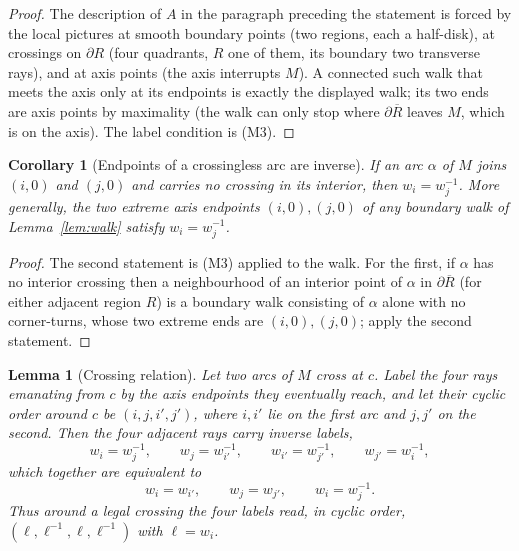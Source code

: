 \documentclass[11pt]{article}
\newtheorem{lemma}{Lemma}
\newtheorem{corollary}{Corollary}
\theoremstyle{definition}
\theoremstyle{remark}
\newcommand{\bdy}{\partial}
\begin{document}
\begin{proof}
The description of $A$ in the paragraph preceding the statement is forced by the
local pictures at smooth boundary points (two regions, each a half-disk), at
crossings on $\bdy R$ (four quadrants, $R$ one of them, its boundary two
transverse rays), and at axis points (the axis interrupts $M$). A connected such
walk that meets the axis only at its endpoints is exactly the displayed walk;
its two ends are axis points by maximality (the walk can only stop where
$\bdy\overline R$ leaves $M$, which is on the axis). The label condition is
(M3).
\end{proof}

\begin{corollary}[Endpoints of a crossingless arc are inverse]\label{lem:arc}
If an arc $\alpha$ of $M$ joins $(i,0)$ and $(j,0)$ and carries no crossing in
its interior, then $w_i=w_j^{-1}$. More generally, the two extreme axis endpoints
$(i,0),(j,0)$ of any boundary walk of Lemma~\ref{lem:walk} satisfy $w_i=w_j^{-1}$.
\end{corollary}

\begin{proof}
The second statement is (M3) applied to the walk. For the first, if $\alpha$ has
no interior crossing then a neighbourhood of an interior point of $\alpha$ in
$\bdy\overline R$ (for either adjacent region $R$) is a boundary walk consisting
of $\alpha$ alone with no corner-turns, whose two extreme ends are $(i,0),(j,0)$;
apply the second statement.
\end{proof}

\begin{lemma}[Crossing relation]\label{lem:cross}
Let two arcs of $M$ cross at $c$. Label the four rays emanating from $c$ by the
axis endpoints they eventually reach, and let their cyclic order around $c$ be
$(i,j,i',j')$, where $i,i'$ lie on the first arc and $j,j'$ on the second. Then
the four \emph{adjacent} rays carry inverse labels,
\begin{equation}\label{eq:cross}
w_i=w_j^{-1},\qquad w_j=w_{i'}^{-1},\qquad w_{i'}=w_{j'}^{-1},\qquad w_{j'}=w_i^{-1},
\end{equation}
which together are equivalent to
\[
w_i=w_{i'},\qquad w_j=w_{j'},\qquad w_i=w_j^{-1}.
\]
Thus around a legal crossing the four labels read, in cyclic order,
$(\ell,\ell^{-1},\ell,\ell^{-1})$ with $\ell=w_i$.
\end{lemma}
\end{document}
